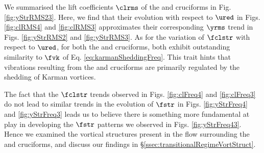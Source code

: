 \documentclass[a4paper,fleqn]{cas-sc}
\begin{document}
We summarised the \rms{} lift coefficients $\clrms$ of the \angfo{} and \angth{} cruciforms in Fig. \ref{fig:yStrRMS23}. Here, we find that their evolution with respect to $\ured$ in Figs. \ref{fig:clRMS4} and \ref{fig:clRMS3} approximates their corresponding $\yrms$ trend in Figs. \ref{fig:yStrRMS2} and \ref{fig:yStrRMS3}. As for the variation of $\fclstr$ with respect to $\ured$, for both the \angfo{} and \angth{} cruciforms, both exhibit outstanding similarity to $\fvk$ of Eq. \ref{eq:karmanSheddingFreq}. This trait hints that vibrations resulting from the \angfo{} and \angth{} cruciforms are primarily regulated by the shedding of Karman vortices.

The fact that the $\fclstr$ trends observed in Figs. \ref{fig:clFreq4} and \ref{fig:clFreq3} do not lead to similar trends in the evolution of $\fstr$ in Figs. \ref{fig:yStrFreq4} and \ref{fig:yStrFreq3} leads us to believe there is something more fundamental at play in developing the $\fstr$ patterns we observed in Figs. \ref{fig:yStrFreq43}. Hence we examined the vortical structures present in the flow surrounding the \angfo{} and \angth{} cruciforms, and discuss our findings in \S\ref{ssec:transitionalRegimeVortStruct}. 
\end{document}
